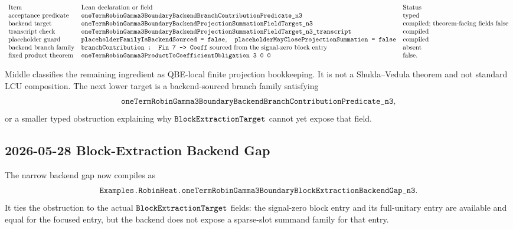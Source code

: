 \[
\begin{array}{lll}
\text{Item} & \text{Lean declaration or field} & \text{Status}\\
\text{acceptance predicate} &
\texttt{oneTermRobinGamma3BoundaryBackendBranchContributionPredicate\_n3} &
\text{typed}\\
\text{backend target} &
\texttt{oneTermRobinGamma3BoundaryBackendProjectionSummationFieldTarget\_n3} &
\text{compiled; theorem-facing fields false}\\
\text{transcript check} &
\texttt{oneTermRobinGamma3BoundaryBackendProjectionSummationFieldTarget\_n3\_transcript} &
\text{compiled}\\
\text{placeholder guard} &
\texttt{placeholderFamilyIsBackendSourced = false},\quad
\texttt{placeholderMayCloseProjectionSummation = false} &
\text{compiled}\\
\text{backend branch family} &
\texttt{branchContribution : Fin 7 -> Coeff}\ \text{sourced from the signal-zero block entry} &
\text{absent}\\
\text{fixed product theorem} &
\texttt{oneTermRobinGamma3ProductToCoefficientObligation\ 3\ 0\ 0} &
\text{false}.
\end{array}
\]

Middle classifies the remaining ingredient as QBE-local finite projection
bookkeeping.  It is not a Shukla--Vedula theorem and not standard LCU
composition.  The next lower target is a backend-sourced branch family
satisfying
\[
  \texttt{oneTermRobinGamma3BoundaryBackendBranchContributionPredicate\_n3},
\]
or a smaller typed obstruction explaining why
\(\texttt{BlockExtractionTarget}\) cannot yet expose that field.

\subsection{2026-05-28 Block-Extraction Backend Gap}

The narrow backend gap now compiles as
\[
  \texttt{Examples.RobinHeat.oneTermRobinGamma3BoundaryBlockExtractionBackendGap\_n3}.
\]
It ties the obstruction to the actual \(\texttt{BlockExtractionTarget}\) fields:
the signal-zero block entry and its full-unitary entry are available and equal
for the focused entry, but the backend does not expose a sparse-slot summand
family for that entry.

